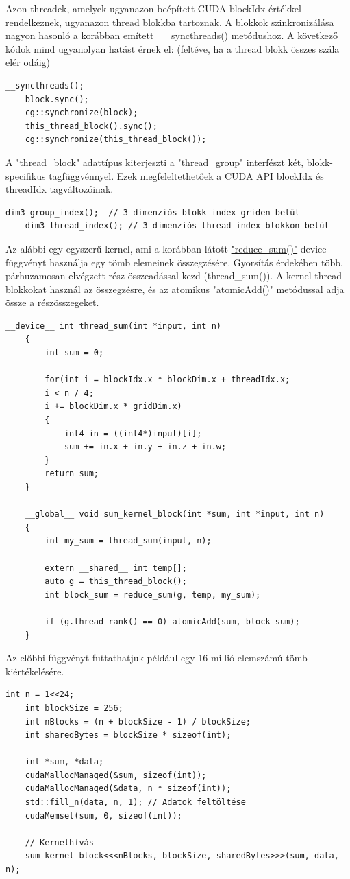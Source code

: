Azon threadek, amelyek ugyanazon beépített CUDA blockIdx értékkel rendelkeznek, ugyanazon thread blokkba tartoznak. A blokkok szinkronizálása nagyon hasonló a korábban emített \_\_syncthreads() metódushoz. A következő kódok mind ugyanolyan hatást érnek el: (feltéve, ha a thread blokk összes szála elér odáig)
\begin{lstlisting}[style=CStyle]
	__syncthreads();
	block.sync();
	cg::synchronize(block);
	this_thread_block().sync();
	cg::synchronize(this_thread_block());
\end{lstlisting}

A "thread\_block" adattípus kiterjeszti a "thread\_group" interfészt két, blokk-specifikus tagfüggvénnyel. Ezek megfeleltethetőek a CUDA API blockIdx és threadIdx tagváltozóinak.
\begin{lstlisting}[style=CStyle]
	dim3 group_index();  // 3-dimenziós blokk index griden belül
	dim3 thread_index(); // 3-dimenziós thread index blokkon belül
\end{lstlisting}

Az alábbi egy egyszerű kernel, ami a korábban látott \hyperlink{reducesum}{"reduce\_sum()"} device függvényt használja egy tömb elemeinek összegzésére. Gyorsítás érdekében több, párhuzamosan elvégzett rész összeadással kezd (thread\_sum()). A kernel thread blokkokat használ az összegzésre, és az atomikus "atomicAdd()" metódussal adja össze a részösszegeket.

\begin{lstlisting}[style=CStyle]
	__device__ int thread_sum(int *input, int n) 
	{
		int sum = 0;
		
		for(int i = blockIdx.x * blockDim.x + threadIdx.x;
		i < n / 4; 
		i += blockDim.x * gridDim.x)
		{
			int4 in = ((int4*)input)[i];
			sum += in.x + in.y + in.z + in.w;
		}
		return sum;
	}
	
	__global__ void sum_kernel_block(int *sum, int *input, int n)
	{
		int my_sum = thread_sum(input, n);
		
		extern __shared__ int temp[];
		auto g = this_thread_block();
		int block_sum = reduce_sum(g, temp, my_sum);
		
		if (g.thread_rank() == 0) atomicAdd(sum, block_sum);
	}
\end{lstlisting}

Az előbbi függvényt futtathatjuk például egy 16 millió elemszámú tömb kiértékelésére.
\begin{lstlisting}[style=CStyle]
	int n = 1<<24;
	int blockSize = 256;
	int nBlocks = (n + blockSize - 1) / blockSize;
	int sharedBytes = blockSize * sizeof(int);
	
	int *sum, *data;
	cudaMallocManaged(&sum, sizeof(int));
	cudaMallocManaged(&data, n * sizeof(int));
	std::fill_n(data, n, 1); // Adatok feltöltése
	cudaMemset(sum, 0, sizeof(int));
	
	// Kernelhívás
	sum_kernel_block<<<nBlocks, blockSize, sharedBytes>>>(sum, data, n);
\end{lstlisting}


